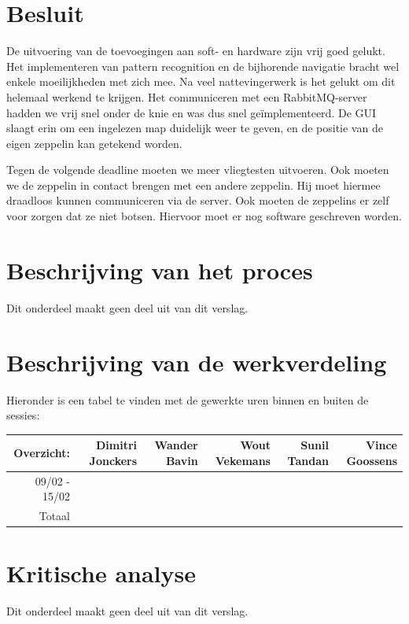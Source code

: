 \documentclass[tt]{penoverslag}
\begin{document}
\section{Besluit}
De uitvoering van de toevoegingen aan soft- en hardware zijn vrij goed gelukt. Het implementeren van pattern recognition en de bijhorende navigatie bracht wel enkele moeilijkheden met zich mee. Na veel nattevingerwerk is het gelukt om dit helemaal werkend te krijgen. Het communiceren met een RabbitMQ-server hadden we vrij snel onder de knie en was dus snel ge\"{i}mplementeerd. De GUI slaagt erin om een ingelezen map duidelijk weer te geven, en de positie van de eigen zeppelin kan getekend worden. 

Tegen de volgende deadline moeten we meer vliegtesten uitvoeren. Ook moeten we de zeppelin in contact brengen met een andere zeppelin. Hij moet hiermee draadloos kunnen communiceren via de server. Ook moeten de zeppelins er zelf voor zorgen dat ze niet botsen. Hiervoor moet er nog software geschreven worden. 


\newpage\makeappendix

\section{Beschrijving van het proces}
Dit onderdeel maakt geen deel uit van dit verslag.


\section{Beschrijving van de werkverdeling}

Hieronder is een tabel te vinden met de gewerkte uren binnen en buiten de sessies: \\

\begin{tabular}{r||r|r|r|r|r}
Overzicht: & Dimitri Jonckers & Wander Bavin & Wout Vekemans & Sunil Tandan & Vince Goossens \\
\hline \hline
09/02 - 15/02 &  &  &  &  &  \\
\hline \hline
Totaal &  &  &  &  &  \\
\end{tabular}


\section{Kritische analyse}
Dit onderdeel maakt geen deel uit van dit verslag.
\end{document}
